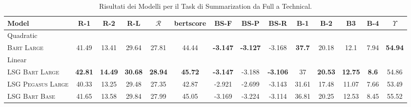 \documentclass[12pt,a4paper,twoside,openright]{book}
\begin{document}
\begin{table}
\centering
\begin{adjustbox}{width=\textwidth,center}
\begin{tabular}{@{}lccccccccccccc@{}}
\toprule
\textbf{Model} & \textbf{R-1} & \textbf{R-2} & \textbf{R-L} & \textbf{\(\mathcal{R}\)} & \textbf{bertscore} & \textbf{BS-F} & \textbf{BS-P} & \textbf{BS-R} & \textbf{B-1} & \textbf{B-2} & \textbf{B3} & \textbf{B-4} & \textbf{\(\Upsilon\)} \\
\midrule
\multicolumn{13}{l}{Quadratic} \\
\rowcolor[rgb]{0.965,0.965,0.965} \textsc{Bart Large} & 41.49 & 13.41 &  29.64 & 27.81 & 44.44 & \textbf{-3.147} & \textbf{-3.127} & -3.168 & \textbf{37.7} & 20.18 & 12.1 & 7.94 & \textbf{54.94} \\
\midrule
\multicolumn{13}{l}{Linear} \\
\textsc{LSG Bart Large} & \textbf{42.81} & \textbf{14.49} & \textbf{30.68} & \textbf{28.94} & \textbf{45.72} & \textbf{-3.147} & -3.188 & \textbf{-3.106} & 37 & \textbf{20.53} & \textbf{12.75} & \textbf{8.6} & 54.86\\
\rowcolor[rgb]{0.965,0.965,0.965} \textsc{LSG Pegasus Large} & 40.33 & 13.25 & 29.48 & 27.35 & 42.87 & -2.921 & -2.699 & -3.143 & 31.61 & 17.48 & 11.07 & 7.66 & 53.49 \\
\textsc{LSG Bart Base} & 41.65 & 13.58 & 29.84 & 27.99 & 45.05 & -3.169 & -3.224 &  -3.114 & 36.81 & 20.25 & 12.53 & 8.45 & 55.52 \\
\bottomrule
\end{tabular}
\end{adjustbox}
\caption{Risultati dei Modelli per il Task di Summarization da Full a Technical.}
\label{tab:res-seq2seq-tech}
\end{table}
\end{document}
